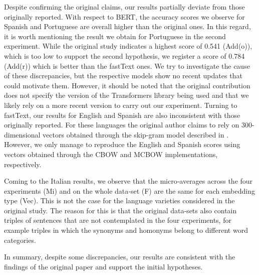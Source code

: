 Despite confirming the original claims, our results partially deviate from those originally reported. With respect to BERT, the accuracy scores we observe for Spanish and Portuguese are overall higher than the original ones. In this regard, it is worth mentioning the result we obtain for Portuguese in the second experiment. While the original study indicates a highest score of 0.541 (Add(o)), which is too low to support the second hypothesis, we register a score of 0.784 (Add(r)) which is better than the fastText ones. We try to investigate the cause of these discrepancies, but the respective models show no recent updates that could motivate them. However, it should be noted that the original contribution does not specify the version of the Transformers library \citep{transformers} being used and that we likely rely on a more recent version to carry out our experiment. Turning to fastText, our results for English and Spanish are also inconsistent with those originally reported. For these languages the original author claims to rely on 300-dimensional vectors obtained through the skip-gram model described in \citet{fasttext:bojanowski:2017}. However, we only manage to reproduce the English and Spanish scores using vectors obtained through the CBOW \citep{fasttext:2018} and MCBOW \citep{fasttext:2018} implementations, respectively.

Coming to the Italian results, we observe that the micro‐averages across the four experiments (Mi) and on the whole data‐set (F) are the same for each embedding type (Vec). This is not the case for the language varieties considered in the original study. The reason for this is that the original data-sets also contain triples of sentences that are not contemplated in the four experiments, for example triples in which the synonyms and homonyms belong to different word categories.

In summary, despite some discrepancies, our results are consistent with the findings of the original paper and support the initial hypotheses.
